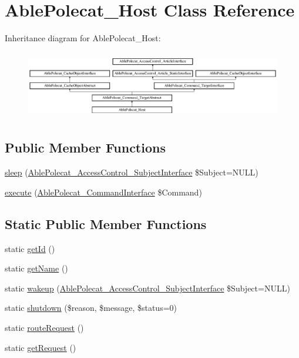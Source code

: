 \hypertarget{class_able_polecat___host}{}\section{Able\+Polecat\+\_\+\+Host Class Reference}
\label{class_able_polecat___host}
Inheritance diagram for Able\+Polecat\+\_\+\+Host\+:\begin{figure}[H]
\begin{center}
\leavevmode
\includegraphics[height=3.010753cm]{class_able_polecat___host}
\end{center}
\end{figure}
\subsection*{Public Member Functions}
\begin{DoxyCompactItemize}
\item 
\hyperlink{class_able_polecat___host_a365e24d7b066205cafa2a5cce3a4f224}{sleep} (\hyperlink{interface_able_polecat___access_control___subject_interface}{Able\+Polecat\+\_\+\+Access\+Control\+\_\+\+Subject\+Interface} \$Subject=N\+U\+L\+L)
\item 
\hyperlink{class_able_polecat___host_aa7f01cbd17bffdbbb7511a3c37756064}{execute} (\hyperlink{interface_able_polecat___command_interface}{Able\+Polecat\+\_\+\+Command\+Interface} \$Command)
\end{DoxyCompactItemize}
\subsection*{Static Public Member Functions}
\begin{DoxyCompactItemize}
\item 
static \hyperlink{class_able_polecat___host_acfaa3a96d0cb5a4c0d4d710dcba41e9e}{get\+Id} ()
\item 
static \hyperlink{class_able_polecat___host_a4ef9bd37ba3ce8a13c1e8bcf4f72a630}{get\+Name} ()
\item 
static \hyperlink{class_able_polecat___host_a3f2135f6ad45f51d075657f6d20db2cd}{wakeup} (\hyperlink{interface_able_polecat___access_control___subject_interface}{Able\+Polecat\+\_\+\+Access\+Control\+\_\+\+Subject\+Interface} \$Subject=N\+U\+L\+L)
\item 
static \hyperlink{class_able_polecat___host_a55c20682b992aa8250b1d03f03f58385}{shutdown} (\$reason, \$message, \$status=0)
\item 
static \hyperlink{class_able_polecat___host_a8133d3834528b23c3532c2435512a5e0}{route\+Request} ()
\item 
static \hyperlink{class_able_polecat___host_a8bc323d82e5265f16d9cd356d0a02dba}{get\+Request} ()
\end{DoxyCompactItemize}

